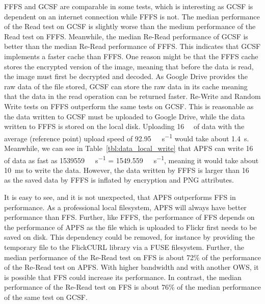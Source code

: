 \gls{FFFS} and \gls{GCSF} are comparable in some tests, which is interesting as \gls{GCSF} is dependent on an internet connection while \gls{FFFS} is not. The median performance of the Read test on \gls{GCSF} is slightly worse than the medium performance of the Read test on \gls{FFFS}. Meanwhile, the median \mbox{Re-Read} performance of \gls{GCSF} is better than the median \mbox{Re-Read} performance of \gls{FFFS}. This indicates that \gls{GCSF} implements a faster cache than \gls{FFFS}. One reason might be that the \gls{FFFS} cache stores the encrypted version of the image, meaning that before the data is read, the image must first be decrypted and decoded. As Google Drive provides the raw data of the file stored, \gls{GCSF} can store the raw data in its cache meaning that the data in the read operation can be returned faster. \mbox{Re-Write} and Random Write tests on \gls{FFFS} outperform the same tests on \gls{GCSF}. This is reasonable as the data written to \gls{GCSF} must be uploaded to Google Drive, while the data written to \gls{FFFS} is stored on the local disk. Uploading \SI{16}{\mega\byte} of data with the average (reference point) upload speed of \SI[per-mode = symbol]{92.95}{\mega\bit\per\second} would take about \SI{1.4}{\second}. Meanwhile, we can see in Table~\ref{tbl:data_local_write} that \gls{APFS} can write \SI{16}{\mega\byte} of data as fast as \SI[per-mode = symbol]{1539559}{\kilo\byte\per\second} = \SI[per-mode = symbol]{1549.559}{\mega\byte\per\second}, meaning it would take about \SI{10}{\milli\second} to write the data. However, the data written by \gls{FFFS} is larger than \SI{16}{\mega\byte} as the saved data by \gls{FFFS} is inflated by encryption and PNG attributes.

It is easy to see, and it is not unexpected, that \gls{APFS} outperforms \gls{FFS} in performance. As a professional local filesystem, \gls{APFS} will always have better performance than FFS. Further, like \gls{FFFS}, the performance of \gls{FFS} depends on the performance of \gls{APFS} as the file which is uploaded to Flickr first needs to be saved on disk. This dependency could be removed, for instance by providing the temporary file to the FlickCURL library via a \gls{FUSE} filesystem. Further, the median performance of the \mbox{Re-Read} test on \gls{FFS} is about 72\% of the performance of the \mbox{Re-Read} test on \gls{APFS}. With higher bandwidth and with another \gls{OWS}, it is possible that \gls{FFS} could increase its performance. In contrast, the median performance of the \mbox{Re-Read} test on \gls{FFS} is about 76\% of the median performance of the same test on \gls{GCSF}.